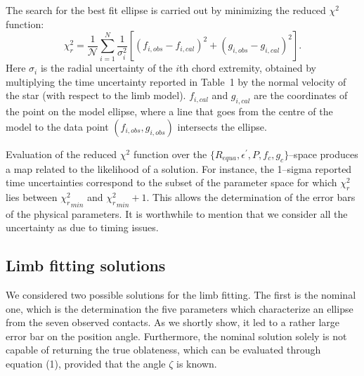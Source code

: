 \documentclass[useAMS,usenatbib]{mn2e}
\begin{document}
The search for the best fit ellipse is carried out by minimizing the reduced $\chi^2$ function:
%
\begin{equation}
\chi^2_r = \frac{1}{\mathcal{N}} \sum_{i=1}^N \frac{1}{\sigma_i^2}  \left[ (f_{i,obs}-f_{i,cal})^2 + (g_{i,obs}-g_{i,cal})^2\right].
\end{equation}
%
Here $\sigma_i$ is the radial uncertainty of the $i$th chord extremity, obtained by multiplying the time uncertainty reported in Table~1 by the normal velocity of the star (with respect to the limb model). $f_{i,cal}$ and $g_{i,cal}$ are the coordinates of the point on the model ellipse, where a line that goes from the centre of the model to the data point $(f_{i,obs},g_{i,obs})$ intersects the ellipse.%
%
%
%

Evaluation of the reduced $\chi^2$ function over the $\lbrace R_{equa}, \epsilon^\prime, P, f_c, g_c \rbrace$--space produces a map related to the likelihood of a solution. For instance, the 1--sigma reported time uncertainties correspond to the subset of the parameter space for which $\chi^2_r$ lies between ${\chi^2_r}_{min}$ and ${\chi^2_r}_{min} + 1$. This allows the determination of the error bars of the physical parameters. It is worthwhile to mention that we consider all the uncertainty as due to timing issues.





\subsection{Limb fitting solutions}

We considered two possible solutions for the limb fitting. The first is the nominal one, which is the determination the five parameters which characterize an ellipse from the seven observed contacts. As we shortly show, it led to a rather large error bar on the position angle. Furthermore, the nominal solution solely is not capable of returning the true oblateness, which can be evaluated through equation (1), provided that the angle $\zeta$ is known.%
\end{document}
